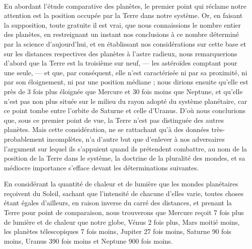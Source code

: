 \documentclass[a4paper, 11pt, oneside]{article}
\begin{document}
\paragraph{}
Eu abordant l'étude comparative des planètes, le premier point qui réclame notre attention est la position occupée par la Terre dans notre système. Or, en faisant la supposition, toute gratuite il est vrai, que nous connaissions le nombre entier des planètes, en restreignant un instant nos conclusions à ce nombre déterminé par la science d'aujourd'hui, et en établissant nos considérations sur cette base et sur les distances respectives des planètes à l'astre radieux, nous remarquerions d'abord que la Terre est la troisième sur neuf, --- les astéroïdes comptant pour une seule, --- et que, par conséquent, elle n'est caractérisée ni par sa proximité, ni par son éloignement, ni par une position médiane ; nous dirions ensuite qu'elle est près de 3 fois plus éloignée que Mercure et 30 fois moins que Neptune, et qu'elle n'est pas non plus située sur le milieu du rayon adopté du système planétaire, car ce point tombe entre l'orbite de Saturne et celle d'Uranus. D'où nous conclurions que, sous ce premier point de vue, la Terre n'est pas distinguée des autres planètes. Mais cette considération, ne se rattachant qu'à des données très-probablement incomplètes, n'a d'autre but que d'enlever à nos adversaires l'argument sur lequel ils s'appuient quand ils prétendent combattre, au nom de la position de la Terre dans le système, la doctrine de la pluralité des mondes, et sa médiocre importance s'efface devant les déterminations suivantes.

En considérant la quantité de chaleur et de lumière que les mondes planétaires reçoivent du Soleil, sachant que l'intensité de chacune d'elles varie, toutes choses étant égales d'ailleurs, en raison inverse du carré des distances, et prenant la Terre pour point de comparaison, nous trouverons que Mercure reçoit 7 fois plus de lumière et de chaleur que notre globe, Vénus 2 fois plus, Mars moitié moins, les planètes télescopiques 7 fois moins, Jupiter 27 fois moins, Saturne 90 fois moins, Uranus 390 fois moins et Neptune 900 fois moins.
\end{document}
